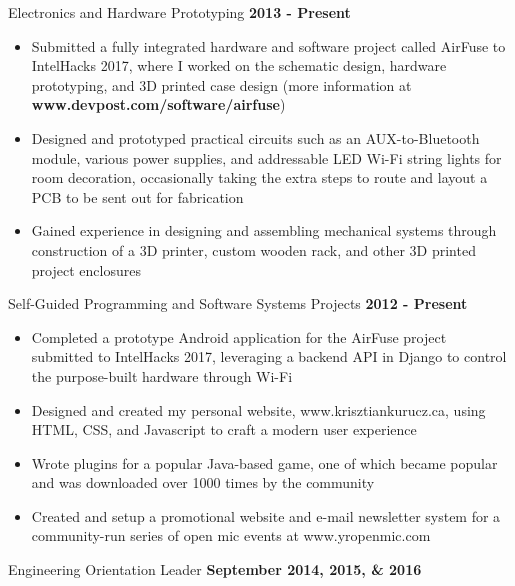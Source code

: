 \documentclass[hidelinks]{kkurucz-cv}
\begin{document}
\begin{entrylist}
\entry
{\vspace{-6mm}\null}
{Electronics and Hardware Prototyping}
{\textbf{2013 - Present}}
{
\vspace{-3mm}
\small{
\begin{itemize}
	\item Submitted a fully integrated hardware and software project called AirFuse to IntelHacks 2017, where I worked on the schematic design, hardware prototyping, and 3D printed case design (more information at \textbf{www.devpost.com/software/airfuse})
	\item Designed and prototyped practical circuits such as an AUX-to-Bluetooth module, various power supplies, and addressable LED Wi-Fi string lights for room decoration, occasionally taking the extra steps to route and layout a PCB to be sent out for fabrication
	\item Gained experience in designing and assembling mechanical systems through construction of a 3D printer, custom wooden rack, and other 3D printed project enclosures
\end{itemize}
}
}
{\null}
\entry
{\vspace{-6mm}\null}
{Self-Guided Programming and Software Systems Projects}
{\textbf{2012 - Present}}
{
\vspace{-3mm}
\small{
\begin{itemize}
	\item Completed a prototype Android application for the AirFuse project submitted to IntelHacks 2017, leveraging a backend API in Django to control the purpose-built hardware through Wi-Fi
	\item Designed and created my personal website, www.krisztiankurucz.ca, using HTML, CSS, and Javascript to craft a modern user experience
	\item Wrote plugins for a popular Java-based game, one of which became popular and was downloaded over 1000 times by the community
	\item Created and setup a promotional website and e-mail newsletter system for a community-run series of open mic events at www.yropenmic.com
\end{itemize}
}
}
{\null}
\entry
{\vspace{-6mm}\null}
{Engineering Orientation Leader}
{\textbf{September 2014, 2015, \& 2016}}
{
\vspace{-4mm}
}
\end{entrylist}
\end{document}
